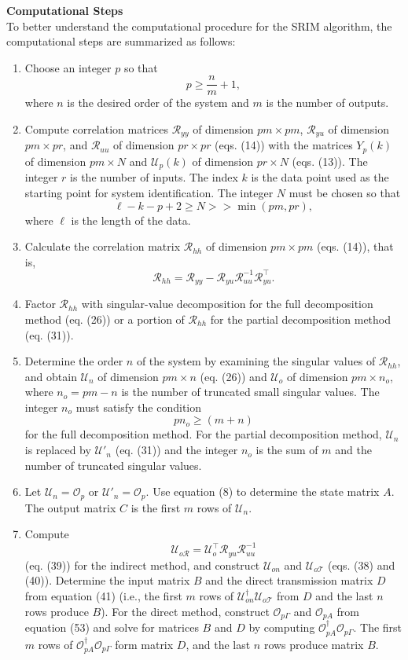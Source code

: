 \textbf{Computational Steps} \\

To better understand the computational procedure for the SRIM algorithm, the computational steps are summarized as follows: 

\begin{enumerate}
  \item Choose an integer $p$ so that 
  \[
    p\geq\frac{n}{m}+1,
  \]
  where $n$ is the desired order of the system and $m$ is the number of outputs. 
  \item Compute correlation matrices $\mathcal{R}_{yy}$ of dimension $pm\times pm$, $\mathcal{R}_{yu}$ of dimension $pm\times pr$, and $\mathcal{R}_{uu}$ of dimension $pr\times pr$ (eqs. (14)) with the matrices $Y_p(k)$ of dimension $pm\times N$ and $\mathcal{U}_p(k)$ of dimension $pr\times N$ (eqs. (13)). 
  The integer $r$ is the number of inputs. 
  The index $k$ is the data point used as the starting point for system identification. 
  The integer $N$ must be chosen so that 
  \[
    \ell-k-p+2\geq N>>\min(pm,pr),
  \]
  where $\ell$ is the length of the data. 
  \item Calculate the correlation matrix $\mathcal{R}_{hh}$ of dimension $pm\times pm$ (eqs. (14)), that is, 
  \[
    \mathcal{R}_{hh}=\mathcal{R}_{yy}-\mathcal{R}_{yu}\mathcal{R}^{-1}_{uu}\mathcal{R}^\top_{yu}.
  \]
  \item Factor $\mathcal{R}_{hh}$ with singular-value decomposition for the full decomposition method (eq. (26)) or a portion of $\mathcal{R}_{hh}$ for the partial decomposition method (eq. (31)). 
  \item Determine the order $n$ of the system by examining the singular values of $\mathcal{R}_{hh}$, and obtain $\mathcal{U}_n$ of dimension $pm\times n$ (eq. (26)) and $\mathcal{U}_o$ of dimension $pm\times n_o$, where $n_o=pm-n$ is the number of truncated small singular values. 
  The integer $n_o$ must satisfy the condition 
  \[
    pn_o\geq(m+n)
  \]
  for the full decomposition method. 
  For the partial decomposition method, $\mathcal{U}_n$ is replaced by $\mathcal{U}'_n$ (eq. (31)) and the integer $n_o$ is the sum of $m$ and the number of truncated singular values. 
  \item Let $\mathcal{U}_n=\mathcal{O}_p$ or $\mathcal{U}'_n=\mathcal{O}_p$. 
  Use equation (8) to determine the state matrix $A$. 
  The output matrix $C$ is the first $m$ rows of $\mathcal{U}_n$. 
  \item Compute 
  \[
    \mathcal{U}_{o\mathcal{R}}=\mathcal{U}_o^\top\mathcal{R}_{yu}\mathcal{R}_{uu}^{-1}
  \]
  (eq. (39)) for the indirect method, and construct $\mathcal{U}_{on}$ and $\mathcal{U}_{o\mathcal{T}}$ (eqs. (38) and (40)). 
  Determine the input matrix $B$ and the direct transmission matrix $D$ from equation (41) (i.e., the first $m$ rows of $\mathcal{U}_{on}^\dagger \mathcal{U}_{o\mathcal{T}}$ from $D$ and the last $n$ rows produce $B$). 
  For the direct method, construct $\mathcal{O}_{p\Gamma}$ and $\mathcal{O}_{pA}$ from equation (53) and solve for matrices $B$ and $D$ by computing $\mathcal{O}_{pA}^\dagger \mathcal{O}_{p\Gamma}$. 
  The first $m$ rows of $\mathcal{O}_{pA}^\dagger\mathcal{O}_{p\Gamma}$ form matrix $D$, and the last $n$ rows produce matrix $B$. 


\end{enumerate}

